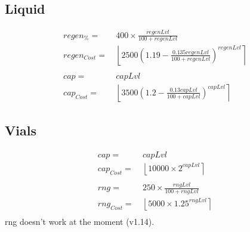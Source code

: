         \subsection{Liquid}
            \begin{align*}
                regen_\% = &\ 400 \times \frac{regenLvl}{100+regenLvl}
                \\ 
                regen_{Cost} = &\ 
                    \left\lfloor 
                        2500\left(1.19-\frac{0.135regenLvl}{100+regenLvl}\right)^{regenLvl}
                    \right\rceil 
                \\ 
                \\
                cap = &\ capLvl
                \\ 
                cap_{Cost} = &\ 
                    \left\lfloor 
                        3500\left(1.2-\frac{0.13capLvl}{100+capLvl}\right)^{capLvl}
                    \right\rceil 
            \end{align*}
        \subsection{Vials}
            \begin{align*}
                cap =  &\ capLvl
                \\ 
                cap_{Cost} = &\ 
                    \left\lfloor 
                        10000 \times 2^{capLvl}
                    \right\rceil 
                \\ 
                \\
                rng = &\ 250 \times \frac{rngLvl}{100+rngLvl}
                \\ 
                rng_{Cost} = &\ 
                    \left\lfloor 
                        5000 \times 1.25^{rngLvl}
                    \right\rceil 
                \\ 
            \end{align*}
            \imp{Note:} rng doesn't work at the moment (v1.14). 
